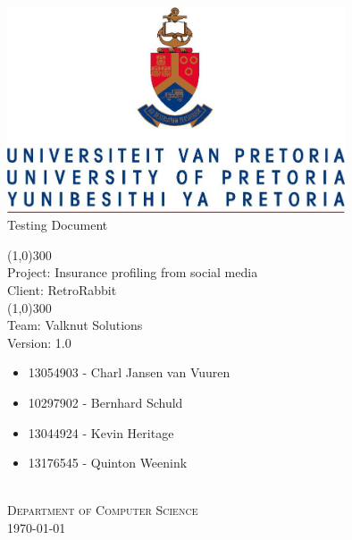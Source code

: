 \documentclass{article}
\begin{document}
	\begin{titlepage}
		\begin{center}
			\includegraphics[width=10cm]{images/UP.jpg}  \\
			[0.5cm]
			\huge{
			Testing Document\\
			}
			
			\line(1,0){300}\\
			[0.2cm]
			\LARGE{Project: Insurance profiling from social media\\
			Client: RetroRabbit} \\
			\line(1,0){300}\\
			\LARGE{Team: Valknut Solutions}\\
			[1.0cm]
			\large{Version: 1.0}\\
			[1.0cm]
			\large
			{
			\begin{itemize}
				\item 13054903 - Charl Jansen van Vuuren 
				\item 10297902 - Bernhard Schuld      
				\item 13044924 - Kevin Heritage
				\item 13176545 - Quinton Weenink\\
			\end{itemize}
			}
			\textsc{\large}\\
		[3.0cm]
		\textsc{\large  Department of Computer Science}\\
		[0.5cm]
		\textsc{\large \today}\\
		\end{center}
	\end{titlepage}
	
	\cleardoublepage
	\begin{versionhistory}
	\end{versionhistory}	
	
	\cleardoublepage
	\tableofcontents
	\cleardoublepage
	
\end{document}
